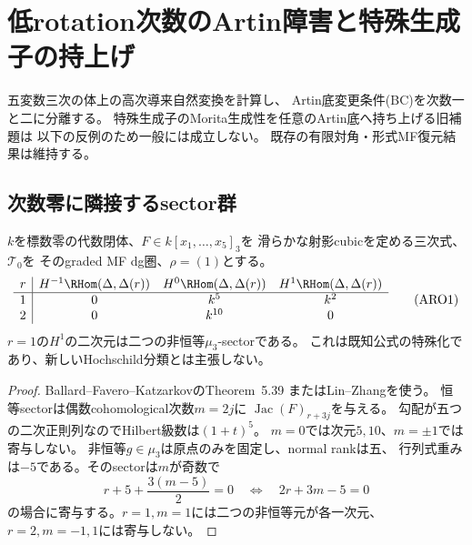 \section{低rotation次数のArtin障害と特殊生成子の持上げ}\label{aro:sec:obstructions}

五変数三次の体上の高次導来自然変換を計算し、
Artin底変更条件(BC)を次数一と二に分離する。
特殊生成子のMorita生成性を任意のArtin底へ持ち上げる旧補題は
以下の反例のため一般には成立しない。
既存の有限対角・形式MF復元結果は維持する。

\subsection{次数零に隣接するsector群}
\begin{proposition}[五変数三次の隣接群]\label{aro:prop:sector-neighbors}
$k$を標数零の代数閉体、$F\in k[x_1,\ldots,x_5]_3$を
滑らかな射影cubicを定める三次式、$\mathcal T_0$を
そのgraded MF dg圏、$\rho=(1)$とする。
\[
\begin{array}{c|ccc}
r&H^{-1}\RHom(\Delta,\Delta(r))&
H^0\RHom(\Delta,\Delta(r))&H^1\RHom(\Delta,\Delta(r))\\\hline
1&0&k^5&k^2\\2&0&k^{10}&0
\end{array}\tag{ARO1}\label{aro:eq:neighbors}
\]
$r=1$の$H^1$の二次元は二つの非恒等$\mu_3$-sectorである。
これは既知公式の特殊化であり、新しいHochschild分類とは主張しない。
\end{proposition}
\begin{proof}
Ballard--Favero--KatzarkovのTheorem~5.39
\cite{AROBFK}またはLin--Zhang\cite{AROLZ}を使う。
恒等sectorは偶数cohomological次数$m=2j$に
$\operatorname{Jac}(F)_{r+3j}$を与える。
勾配が五つの二次正則列なのでHilbert級数は$(1+t)^5$。
$m=0$では次元$5,10$、$m=\pm1$では寄与しない。
非恒等$g\in\mu_3$は原点のみを固定し、normal rankは五、
行列式重みは$-5$である。そのsectorは$m$が奇数で
\[
r+5+\frac{3(m-5)}2=0
\quad\Longleftrightarrow\quad2r+3m-5=0
\tag{ARO2}\label{aro:eq:weight}
\]
の場合に寄与する。$r=1,m=1$には二つの非恒等元が各一次元、
$r=2,m=-1,1$には寄与しない。
\end{proof}

